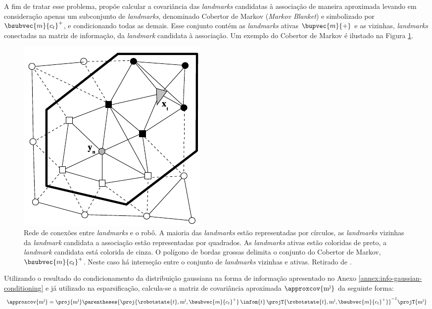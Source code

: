 A fim de tratar esse problema, \cite[p.~5]{liu2003results} propõe 
calcular a covariância das \textit{landmarks} candidatas à associação 
de maneira aproximada levando em consideração apenas um subconjunto 
de \textit{landmarks}, denominado Cobertor de Markov 
(\textit{Markov Blanket}) e simbolizado por $\bsubvec{m}{c_t}^+$, e condicionando todas as demais. Esse conjunto contém as \textit{landmarks} ativas 
$\bupvec{m}{+}$ e as vizinhas, \textit{landmarks} conectadas na matriz de 
informação, da \textit{landmark} candidata à associação. Um exemplo do Cobertor 
de Markov é ilustado na Figura \ref{fig:markov-blanket}.

\begin{figure}[h]
  \centering
  \includegraphics[]{figs/pb-markov-blanket}
  \caption{Rede de conexões entre \textit{landmarks} e o robô. A maioria das \textit{landmarks} estão representadas por círculos, as \textit{landmarks} vizinhas da \textit{landmark} candidata a associação estão representadas por quadrados. As \textit{landmarks} ativas estão coloridas de preto, a \textit{landmark} candidata está colorida de cinza. O polígono de bordas grossas delimita o conjunto do Cobertor de Markov, $\bsubvec{m}{c_t}^+$. Neste caso há interseção entre o conjunto de \textit{landmarks} vizinhas e ativas. Retirado de \cite[p.~410]{bongard2006probabilistic}.}
  \label{fig:markov-blanket}
\end{figure}

Utilizando o resultado do condicionamento da distribuição gaussiana na forma de 
informação apresentado no Anexo \ref{annex:info-gaussian-conditioning} e já 
utilizado na esparsificação, calcula-se a matriz de covariância aproximada $\approxcov{\mathrm{m^j}}$ da seguinte forma:
\begin{equation}
  \approxcov{\mathrm{m^j}} = \proj{\mathrm{m^j}} \parentheses{\proj{\robotstate{t}, \mathrm{m^j}, \bsubvec{m}{c_t}^+}\, \infom{t} \,\projT{\robotstate{t}, \mathrm{m^j}, \bsubvec{m}{c_t}^+}}^{-1} \projT{\mathrm{m^j}}
\end{equation}

